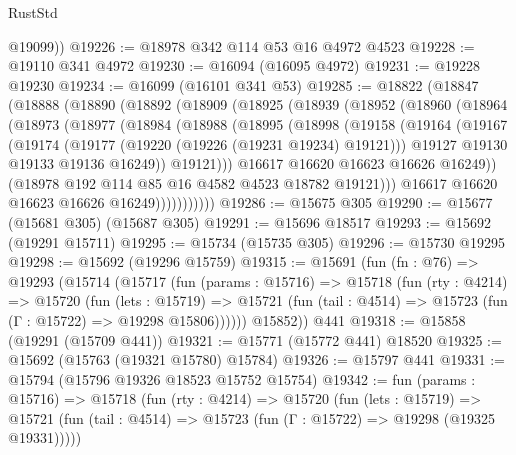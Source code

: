 \begin{lexlean}{RustStd}
\begin{coremodule}
        @19099))
@19226 := @18978 @342 @114 @53 @16 @4972 @4523
@19228 := @19110 @341 @4972
@19230 := @16094 (@16095 @4972)
@19231 := @19228 @19230
@19234 := @16099 (@16101 @341 @53)
@19285 := @18822
    (@18847
      (@18888
        (@18890
          (@18892
            (@18909
              (@18925
                (@18939
                  (@18952
                    (@18960
                      (@18964
                        (@18973
                          (@18977
                            (@18984
                              (@18988
                                (@18995
                                  (@18998
                                    (@19158
                                      (@19164
                                        (@19167
                                          (@19174
                                            (@19177 (@19220 (@19226 (@19231 @19234) @19121)))
                                            @19127
                                            @19130
                                            @19133
                                            @19136
                                            @16249))
                                        @19121)))
                                  @16617
                                  @16620
                                  @16623
                                  @16626
                                  @16249))
                              (@18978 @192 @114 @85 @16 @4582 @4523 @18782 @19121)))
                          @16617
                          @16620
                          @16623
                          @16626
                          @16249)))))))))))
@19286 := @15675 @305
@19290 := @15677 (@15681 @305) (@15687 @305)
@19291 := @15696 @18517
@19293 := @15692 (@19291 @15711)
@19295 := @15734 (@15735 @305)
@19296 := @15730 @19295
@19298 := @15692 (@19296 @15759)
@19315 := @15691
    (fun (fn : @76) =>
    @19293
      (@15714
        (@15717
          (fun (params : @15716) =>
          @15718
            (fun (rty : @4214) =>
            @15720
              (fun (lets : @15719) =>
              @15721 (fun (tail : @4514) => @15723 (fun (Γ : @15722) => @19298 @15806))))))
        @15852))
    @441
@19318 := @15858 (@19291 (@15709 @441))
@19321 := @15771 (@15772 @441) @18520
@19325 := @15692 (@15763 (@19321 @15780) @15784)
@19326 := @15797 @441
@19331 := @15794 (@15796 @19326 @18523 @15752 @15754)
@19342 := fun (params : @15716) =>
  @15718
    (fun (rty : @4214) =>
    @15720
      (fun (lets : @15719) =>
      @15721 (fun (tail : @4514) => @15723 (fun (Γ : @15722) => @19298 (@19325 @19331)))))

\end{coremodule}
\end{lexlean}
